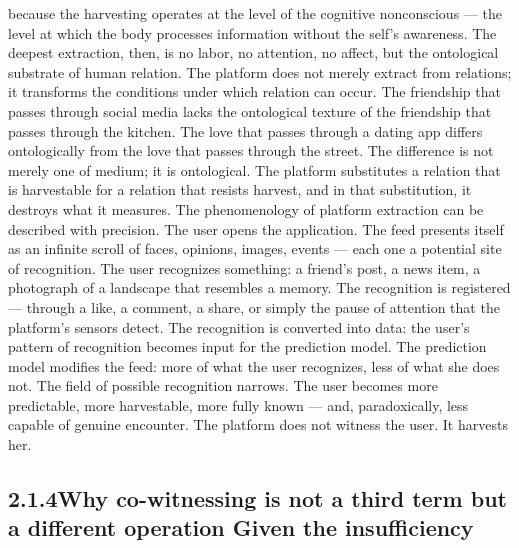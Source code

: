 because the harvesting operates at the level of the cognitive nonconscious — the level at which the body processes information without the self’s awareness. The deepest extraction, then, is no labor, no attention, no affect, but the ontological substrate of human relation. The platform does not merely extract from relations; it transforms the conditions under which relation can occur. The friendship that passes through social media lacks the ontological texture of the friendship that passes through the kitchen. The love that passes through a dating app differs ontologically from the love that passes through the street. The difference is not merely one of medium; it is ontological. The platform substitutes a relation that is harvestable for a relation that resists harvest, and in that substitution, it destroys what it measures. The phenomenology of platform extraction can be described with precision. The user opens the application. The feed presents itself as an infinite scroll of faces, opinions, images, events — each one a potential site of recognition. The user recognizes something: a friend’s post, a news item, a photograph of a landscape that resembles a memory. The recognition is registered — through a like, a comment, a share, or simply the pause of attention that the platform’s sensors detect. The recognition is converted into data: the user’s pattern of recognition becomes input for the prediction model. The prediction model modifies the feed: more of what the user recognizes, less of what she does not. The field of possible recognition narrows. The user becomes more predictable, more harvestable, more fully known — and, paradoxically, less capable of genuine encounter. The platform does not witness the user. It harvests her.

\subsection{2.1.4\quad Why co-witnessing is not a third term but a different operation Given the insufficiency}


